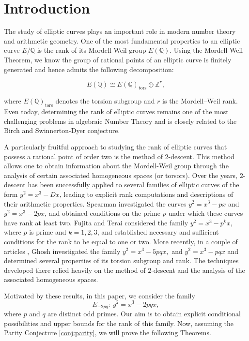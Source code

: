 \documentclass[12pt]{amsart}
\numberwithin{equation}{section}
\theoremstyle{definition}
\begin{document}
\section{Introduction}


The study of elliptic curves plays an important role in modern number theory and arithmetic geometry. One of the most fundamental properties to an elliptic curve $E/\mathbb{Q}$ is the rank of its Mordell-Weil group $E(\mathbb{Q})$. Using the Mordell-Weil Theorem, we know the group of rational points of an elliptic curve is finitely generated and hence admits the following decomposition:

$$
E(\mathbb{Q}) \cong E(\mathbb{Q})_{\mathrm{tors}} \oplus \mathbb{Z}^{r},
$$

where $E(\mathbb{Q})_{\mathrm{tors}}$ denotes the torsion subgroup and $r$ is the Mordell--Weil rank. Even today, determining the rank of elliptic curves remains one of the most challenging problems in algebraic Number Theory and is closely related to the Birch and Swinnerton-Dyer conjecture.

A particularly fruitful approach to studying the rank of elliptic curves that possess a rational point of order two is the method of $2$-descent. This method allows one to obtain information about the Mordell-Weil group through the analysis of certain associated homogeneous spaces (or torsors). Over the years, $2$-descent has been successfully applied to several families of elliptic curves of the form $y^2=x^3-Dx$, leading to explicit rank computations and descriptions of their arithmetic properties. Spearman \cite{Sp07,Sp07_1} investigated the curves $ y^2=x^3-px$ and $y^2=x^3-2px$, and obtained conditions on the prime $p$ under which these curves have rank at least two. Fujita and Terai \cite{FT11} considered the family
$
y^2=x^3-p^k x,
$
where $p$ is prime and $k=1,2,3$, and established necessary and sufficient conditions for the rank to be equal to one or two. More recently, in a couple of articles \cite{Gh25, Gh26}, Ghosh  investigated the family
$
y^2=x^3-5pqx,
$
and
$
y^2=x^3-pqx
$
and determined several properties of its torsion subgroup and rank. The techniques developed there relied heavily on the method of $2$-descent and the analysis of the associated homogeneous spaces.


Motivated by these results, in this paper, we consider the family
\begin{equation}
\label{eq:1.1}
    E_{-2pq}:~ y^2 = x^3 -2pqx,
\end{equation}where $p$ and $q$ are distinct odd primes. Our aim is to obtain
explicit conditional possibilities and upper bounds for the rank of this family.
Now, assuming the Parity Conjecture \ref{conj:parity}, we will prove the following Theorems.
\end{document}
